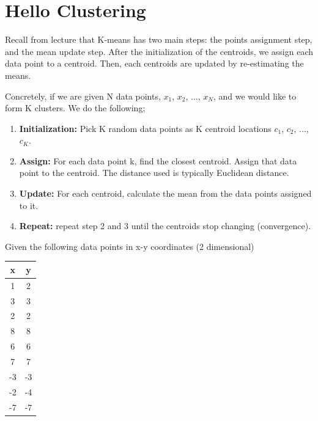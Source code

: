 \documentclass[12pt, a4paper]{article}
\begin{document}
        \pagebreak

    \section*{Hello Clustering}

	Recall from lecture that K-means has two main steps: the points assignment step, and the mean update step. After the initialization of the centroids, we assign each data point to a centroid. Then, each centroids are updated by re-estimating the means.

    Concretely, if we are given N data points, $x_{1}$, $x_{2}$, ..., $x_{N}$, and we would like to form K clusters. We do the following;

    \begin{enumerate}
        \item \textbf{Initialization:} Pick K random data points as K centroid locations $c_{1}$, $c_{2}$, ..., $c_{K}$.

        \item \textbf{Assign:} For each data point k, find the closest centroid. Assign that data point to the centroid. The distance used is typically Euclidean distance.

        \item \textbf{Update:} For each centroid, calculate the mean from the data points assigned to it.

        \item \textbf{Repeat:} repeat step 2 and 3 until the centroids stop changing (convergence).
    \end{enumerate}

    \noindent Given the following data points in x-y coordinates (2 dimensional)

    \begin{table}[h]
        \centering
        \begin{tabular}{|c|c|}
            \hline
            x & y \\
            \hline
            1 & 2 \\
            3 & 3 \\
            2 & 2 \\
            8 & 8 \\
            6 & 6 \\
            7 & 7 \\
            -3 & -3 \\
            -2 & -4 \\
            -7 & -7 \\
            \hline
        \end{tabular}
    \end{table}
\end{document}

